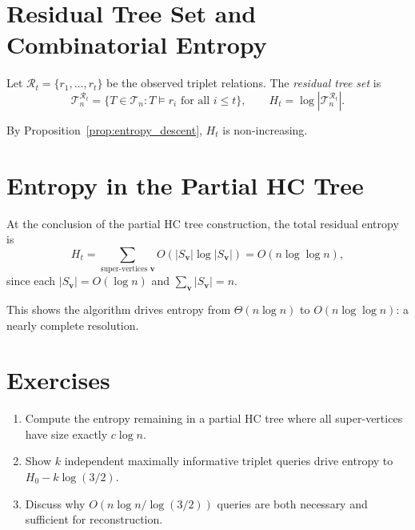 \section{Residual Tree Set and Combinatorial Entropy}

\begin{definition}
Let $\mathcal{R}_t = \{r_1, \ldots, r_t\}$ be the observed triplet relations. The \emph{residual tree set} is
\[
\mathcal{T}_n^{\mathcal{R}_t} = \{T \in \mathcal{T}_n : T \models r_i \text{ for all } i \leq t\}, \qquad H_t = \log |\mathcal{T}_n^{\mathcal{R}_t}|.
\]
\end{definition}

By Proposition~\ref{prop:entropy_descent}, $H_t$ is non-increasing.

\section{Entropy in the Partial HC Tree}

\begin{proposition}
At the conclusion of the partial HC tree construction, the total residual entropy is
\[
H_t = \sum_{\text{super-vertices } \mathbf{v}} O(|S_\mathbf{v}|\log|S_\mathbf{v}|) = O(n\log\log n),
\]
since each $|S_\mathbf{v}| = O(\log n)$ and $\sum_\mathbf{v}|S_\mathbf{v}| = n$.
\end{proposition}

This shows the algorithm drives entropy from $\Theta(n\log n)$ to $O(n\log\log n)$: a nearly complete resolution.

\section{Exercises}

\begin{enumerate}
  \item Compute the entropy remaining in a partial HC tree where all super-vertices have size exactly $c\log n$.
  \item Show $k$ independent maximally informative triplet queries drive entropy to $H_0 - k\log(3/2)$.
  \item Discuss why $O(n\log n / \log(3/2))$ queries are both necessary and sufficient for reconstruction.
\end{enumerate}
